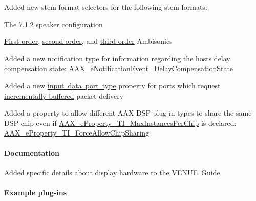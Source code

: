 \begin{DoxyItemize}
\item Added new stem format selectors for the following stem formats\+: 
\begin{DoxyItemize}
\item The \mbox{\hyperlink{a00491_ad8af5ef008b2bd478add9a0acb0a1d85a434dbed527c350cb45787299ead28156}{7.1.2}} speaker configuration 
\item \mbox{\hyperlink{a00491_ad8af5ef008b2bd478add9a0acb0a1d85a398f50508a237917d9c81be645ca4b90}{First-\/order}}, \mbox{\hyperlink{a00491_ad8af5ef008b2bd478add9a0acb0a1d85af6461ee858e0f121f7a070142f047dbb}{second-\/order}}, and \mbox{\hyperlink{a00491_ad8af5ef008b2bd478add9a0acb0a1d85a111ef1882171d9eea1b1b436e037fb47}{third-\/order}} Ambisonics 
\end{DoxyItemize}
\item Added a new notification type for information regarding the host\textquotesingle{}s delay compensation state\+: \mbox{\hyperlink{a00491_afab5ea2cfd731fc8f163b6caa685406ea3336fd8cb2428399ab640ee91582c626}{A\+A\+X\+\_\+e\+Notification\+Event\+\_\+\+Delay\+Compensation\+State}}  
\item Added a new \mbox{\hyperlink{a00491_ab5677b173ad8647c24d34d28272d11fc}{input data port type}} property for ports which request \mbox{\hyperlink{a00491_ab5677b173ad8647c24d34d28272d11fca4c356b21e878cfafca33ff61e1044b2e}{incrementally-\/buffered}} packet delivery 
\item Added a property to allow different A\+AX D\+SP plug-\/in types to share the same D\+SP chip even if \mbox{\hyperlink{a00662_a13e384f22825afd3db6d68395b79ce0da5b85e213113b7f0f7ee4bac4f5eaa59d}{A\+A\+X\+\_\+e\+Property\+\_\+\+T\+I\+\_\+\+Max\+Instances\+Per\+Chip}} is declared\+: \mbox{\hyperlink{a00662_a13e384f22825afd3db6d68395b79ce0da2f040408f0cc8d72f8069db8b3192ee7}{A\+A\+X\+\_\+e\+Property\+\_\+\+T\+I\+\_\+\+Force\+Allow\+Chip\+Sharing}}  
\end{DoxyItemize}\hypertarget{a00847_aax_sdk_2p2p2_Documentation}{}\paragraph{Documentation}\label{a00847_aax_sdk_2p2p2_Documentation}

\begin{DoxyItemize}
\item Added specific details about display hardware to the \mbox{\hyperlink{a00849}{V\+E\+N\+UE Guide}} 
\end{DoxyItemize}\hypertarget{a00847_aax_sdk_2p2p2_Example_plugins}{}\paragraph{Example plug-\/ins}\label{a00847_aax_sdk_2p2p2_Example_plugins}

